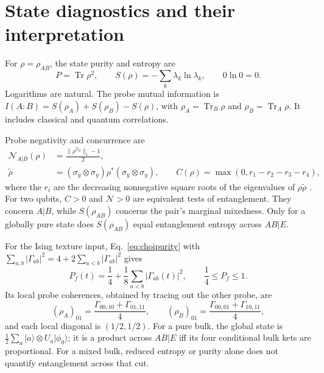 \documentclass[11pt,a4paper]{article}
\newcommand{\ket}[1]{\lvert #1\rangle}
\newcommand{\Tr}{\operatorname{Tr}}
\begin{document}
\appendix
\section{State diagnostics and their interpretation}\label{app:observables}

For $\rho=\rho_{AB}$, the state purity and entropy are
\begin{equation}
 P=\Tr\rho^2,\qquad S(\rho)=-\sum_k\lambda_k\ln\lambda_k,
 \qquad 0\ln0=0.
\end{equation}
Logarithms are natural. The probe mutual information is
$I(A:B)=S(\rho_A)+S(\rho_B)-S(\rho)$, with
$\rho_A=\Tr_B\rho$ and $\rho_B=\Tr_A\rho$. It includes classical
and quantum correlations.

Probe negativity and concurrence are
\begin{align}
 \mathcal N_{A|B}(\rho)&=\frac{\|\rho^{T_B}\|_1-1}{2},\\
 \widetilde\rho&=(\sigma_y\otimes\sigma_y)\rho^*
 (\sigma_y\otimes\sigma_y),\qquad
 C(\rho)=\max(0,r_1-r_2-r_3-r_4),
\end{align}
where the $r_i$ are the decreasing nonnegative square roots of the
eigenvalues of $\rho\widetilde\rho$ \cite{Wootters1998}.
For two qubits, $C>0$ and $\mathcal N>0$ are equivalent tests of
entanglement. They concern $A|B$, while $S(\rho_{AB})$ concerns the
pair's marginal mixedness. Only for a globally pure state does
$S(\rho_{AB})$ equal entanglement entropy across $AB|E$.

For the Ising texture input, Eq.~\eqref{eq:choipurity} with
$\sum_{a,b}|\Gamma_{ab}|^2=4+2\sum_{a<b}|\Gamma_{ab}|^2$ gives
\begin{equation}
 P_f(t)=\frac14+\frac18\sum_{a<b}|\Gamma_{ab}(t)|^2,
 \qquad \frac14\le P_f\le1.
\end{equation}
Its local probe coherences, obtained by tracing out the other probe, are
\begin{equation}
 (\rho_A)_{01}=\frac{\Gamma_{00,10}+\Gamma_{01,11}}4,
 \qquad (\rho_B)_{01}=\frac{\Gamma_{00,01}+\Gamma_{10,11}}4,
\end{equation}
and each local diagonal is $(1/2,1/2)$.
For a pure bulk, the global state is
$\frac12\sum_a\ket a\otimes U_a\ket{\phi_0}$; it is a product
across $AB|E$ iff its four conditional bulk kets are proportional.
For a mixed bulk, reduced entropy or purity alone does not quantify
entanglement across that cut.



\end{document}
